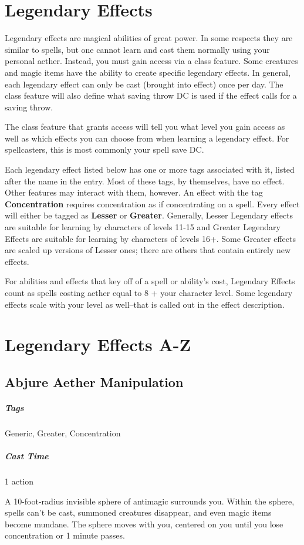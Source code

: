 \section{Legendary Effects}
Legendary effects are magical abilities of great power. In some respects they are similar to spells, but one cannot learn and cast them normally using your personal aether. Instead, you must gain access via a class feature. Some creatures and magic items have the ability to create specific legendary effects. In general, each legendary effect can only be cast (brought into effect) once per day. The class feature will also define what saving throw DC is used if the effect calls for a saving throw.

The class feature that grants access will tell you what level you gain access as well as which effects you can choose from when learning a legendary effect.  For spellcasters, this is most commonly your spell save DC.

Each legendary effect listed below has one or more tags associated with it, listed after the name in the entry. Most of these tags, by themselves, have no effect. Other features may interact with them, however. An effect with the tag \textbf{Concentration} requires concentration as if concentrating on a spell. Every effect will either be tagged as \textbf{Lesser} or \textbf{Greater}. Generally, Lesser Legendary effects are suitable for learning by characters of levels 11-15 and Greater Legendary Effects are suitable for learning by characters of levels 16+. Some Greater effects are scaled up versions of Lesser ones; there are others that contain entirely new effects.

For abilities and effects that key off of a spell or ability's cost, Legendary Effects count as spells costing aether equal to 8 + your character level. Some legendary effects scale with your level as well--that is called out in the effect description.

\section{Legendary Effects A-Z}
\subsection{Abjure Aether Manipulation}
\subparagraph*{Tags} Generic, Greater, Concentration
\subparagraph*{Cast Time} 1 action

A 10-foot-radius invisible sphere of antimagic surrounds you. Within the sphere, spells can’t be cast, summoned creatures disappear, and even magic items become mundane. The sphere moves with you, centered on you until you lose concentration or 1 minute passes.

